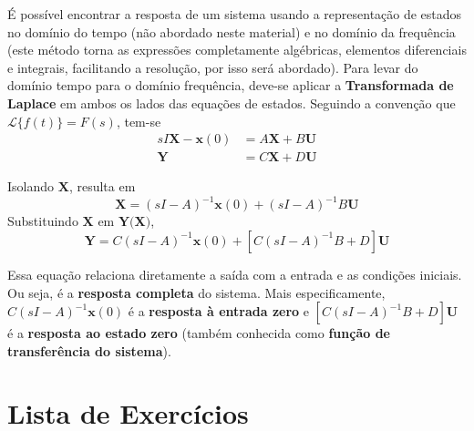 \documentclass{article}
\numberwithin{equation}{section}
\begin{document}
    É possível encontrar a resposta de um sistema usando a representação de estados no domínio do tempo (não abordado neste material) e no domínio da frequência (este método torna as expressões completamente algébricas, elementos diferenciais e integrais, facilitando a resolução, por isso será abordado). Para levar do domínio tempo para o domínio frequência, deve-se aplicar a \textbf{Transformada de Laplace} em ambos os lados das equações de estados. Seguindo a convenção que $\mathscr{L}\{f(t)\}=F(s)$, tem-se
    \begin{equation*}
        \begin{split}
            sI\textbf{X}-\textbf{x}(0)&=A\textbf{X}+B\textbf{U} \\
                        \textbf{Y}&=C\textbf{X}+D\textbf{U}
        \end{split}
    \end{equation*}

    \noindent Isolando $\textbf{X}$, resulta em
    \begin{equation*}
        \textbf{X}=(sI-A)^{-1}\textbf{x}(0)+(sI-A)^{-1}B\textbf{U}
    \end{equation*}
    Substituindo $\textbf{X}$ em $\textbf{Y(X)}$,
    \begin{equation}
        \textbf{Y}=C(sI-A)^{-1}\textbf{x}(0)+[C(sI-A)^{-1}B + D]\textbf{U}
    \end{equation}

    Essa equação relaciona diretamente a saída com a entrada e as condições iniciais. Ou seja, é a \textbf{resposta completa} do sistema. Mais especificamente, $C(sI-A)^{-1}\textbf{x}(0)$ é a \textbf{resposta à entrada zero} e $[C(sI-A)^{-1}B+D]\textbf{U}$ é a \textbf{resposta ao estado zero} (também conhecida como \textbf{função de transferência do sistema}).


    \newpage

    \section{Lista de Exercícios}
    \label{sec:exerc}
\end{document}
